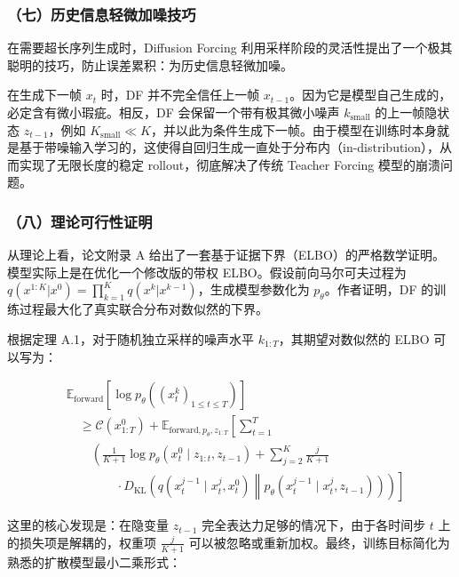 \hypertarget{ux4e03ux5386ux53f2ux4fe1ux606fux8f7bux5faeux52a0ux566aux6280ux5de7}{%
\subsubsection{（七）历史信息轻微加噪技巧}\label{ux4e03ux5386ux53f2ux4fe1ux606fux8f7bux5faeux52a0ux566aux6280ux5de7}}

在需要超长序列生成时，Diffusion Forcing 利用采样阶段的灵活性提出了一个极其聪明的技巧，防止误差累积：为历史信息轻微加噪。

在生成下一帧 \(x_t\) 时，DF 并不完全信任上一帧 \(x_{t-1}\)。因为它是模型自己生成的，必定含有微小瑕疵。相反，DF 会保留一个带有极其微小噪声 \(k_{\mathrm{small}}\) 的上一帧隐状态 \(z_{t-1}\)，例如 \(K_{\mathrm{small}}\ll K\)，并以此为条件生成下一帧。由于模型在训练时本身就是基于带噪输入学习的，这使得自回归生成一直处于分布内（in-distribution），从而实现了无限长度的稳定 rollout，彻底解决了传统 Teacher Forcing 模型的崩溃问题。

\hypertarget{ux516bux7406ux8bbaux53efux884cux6027ux8bc1ux660e}{%
\subsubsection{（八）理论可行性证明}\label{ux516bux7406ux8bbaux53efux884cux6027ux8bc1ux660e}}

从理论上看，论文附录 A 给出了一套基于证据下界（ELBO）的严格数学证明。模型实际上是在优化一个修改版的带权 ELBO。假设前向马尔可夫过程为 \(q(x^{1:K}|x^0)=\prod_{k=1}^K q(x^k|x^{k-1})\)，生成模型参数化为 \(p_\theta\)。作者证明，DF 的训练过程最大化了真实联合分布对数似然的下界。

根据定理 A.1，对于随机独立采样的噪声水平 \(k_{1:T}\)，其期望对数似然的 ELBO 可以写为：

\[
\begin{aligned}
&\mathbb{E}_{\mathrm{forward}}
\left[
\log p_\theta\left((x_t^k)_{1\le t\le T}\right)
\right] \\
&\quad \ge \mathcal{C}(x_{1:T}^0)
+\mathbb{E}_{\mathrm{forward},p_\theta,z_{1:T}}
\left[
\sum_{t=1}^T
\right. \\
&\qquad \left.
\left(
\frac{1}{K+1}\log p_\theta(x_t^0\mid z_{1:t},z_{t-1})
+\sum_{j=2}^K\frac{j}{K+1}
\right.
\right. \\
&\qquad\qquad \left.\left.
{}\cdot D_{\mathrm{KL}}\left(
q(x_t^{j-1}\mid x_t^j,x_t^0)
\middle\|
p_\theta(x_t^{j-1}\mid x_t^j,z_{t-1})
\right)
\right)
\right]
\end{aligned}
\]

这里的核心发现是：在隐变量 \(z_{t-1}\) 完全表达力足够的情况下，由于各时间步 \(t\) 上的损失项是解耦的，权重项 \(\frac{j}{K+1}\) 可以被忽略或重新加权。最终，训练目标简化为熟悉的扩散模型最小二乘形式：

